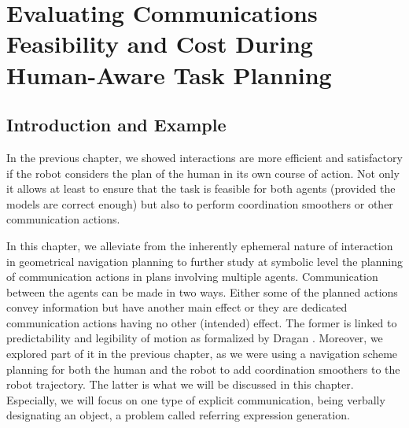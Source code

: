 \documentclass[a4paper,11pt,twoside]{StyleThese}
\begin{document}
\setcounter{chapter}{2} %
\dominitoc
\faketableofcontents
\fi

\chapter{Evaluating Communications Feasibility and Cost During Human-Aware Task Planning}
\label{chapter:comm}
\minitoc

\section{Introduction and Example}
In the previous chapter, we showed interactions are more efficient and satisfactory if the robot considers the plan of the human in its own course of action. Not only it allows at least to ensure that the task is feasible for both agents (provided the models are correct enough) but also to perform coordination smoothers or other communication actions.

In this chapter, we alleviate from the inherently ephemeral nature of interaction in geometrical navigation planning to further study at symbolic level the planning of communication actions in plans involving multiple agents. Communication between the agents can be made in two ways. Either some of the planned actions convey information but have another main effect or they are dedicated communication actions having no other (intended) effect. The former is linked to predictability and legibility of motion as formalized by Dragan \cite{dragan_legibility_2013}. Moreover, we explored part of it in the previous chapter, as we were using a navigation scheme planning for both the human and the robot to add coordination smoothers to the robot trajectory. The latter is what we will be discussed in this chapter. Especially, we will focus on one type of explicit communication, being verbally designating an object, a problem called referring expression generation.
\end{document}
